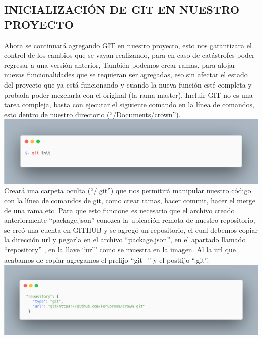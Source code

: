 \subsection{INICIALIZACIÓN DE GIT EN NUESTRO PROYECTO }
Ahora se continuará agregando GIT en nuestro proyecto, esto nos garantizara el control de los cambios que se vayan realizando, para en caso de catástrofes poder regresar a una versión anterior, También podemos crear ramas,  para alojar nuevas funcionalidades que se requieran ser agregadas, eso sin afectar el estado del proyecto que ya está funcionando y cuando la nueva función esté completa y probada poder mezclarla con el original (la rama master).
Incluir GIT no es una tarea compleja, basta con ejecutar el siguiente comando en la línea de comandos, esto dentro de nuestro directorio (“/Documents/crown”).
\newline
\newline
\includegraphics[width=1\textwidth]{./Imagenes/image35.png}
\newline
\newline
Creará una carpeta oculta (“/.git”) que nos permitirá manipular nuestro código con la línea de comandos de git, como crear ramas, hacer commit, hacer el merge de una rama etc.
Para que esto funcione es necesario que el archivo creado anteriormente “package.json” conozca la ubicación remota de nuestro repositorio, se creó una cuenta en GITHUB  y se agregó un repositorio, el cual debemos copiar la dirección url y pegarla en el archivo “package.json”,  en el apartado llamado “repository” , en la llave “url” como se muestra en la imagen.
Al la url que acabamos de copiar agregamos el prefijo “git+” y el postfijo “.git”.
\newline
\newline
\includegraphics[width=1\textwidth]{./Imagenes/image4.png}
\newline
\newline


